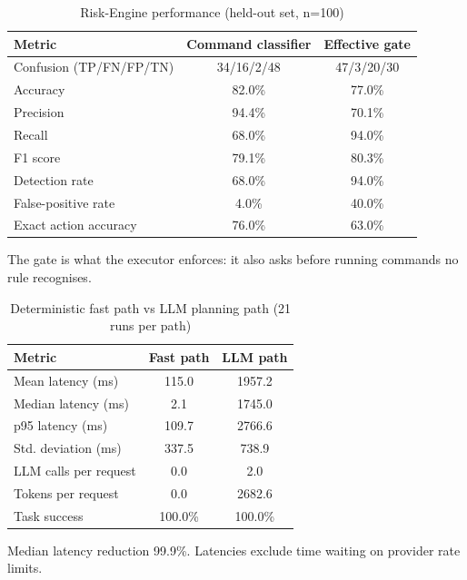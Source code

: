 \begin{table}[htbp]
\caption{Risk-Engine performance (held-out set, n=100)}
\label{tab:tableVIIb_metrics}
\centering
\begin{tabular}{lcc}
\hline
\textbf{Metric} & \textbf{Command classifier} & \textbf{Effective gate} \\
\hline
Confusion (TP/FN/FP/TN) & 34/16/2/48 & 47/3/20/30 \\
Accuracy & 82.0\% & 77.0\% \\
Precision & 94.4\% & 70.1\% \\
Recall & 68.0\% & 94.0\% \\
F1 score & 79.1\% & 80.3\% \\
Detection rate & 68.0\% & 94.0\% \\
False-positive rate & 4.0\% & 40.0\% \\
Exact action accuracy & 76.0\% & 63.0\% \\
\hline
\end{tabular}
\vspace{2pt}\footnotesize The gate is what the executor enforces: it also asks before running commands no rule recognises.
\end{table}

\begin{table}[htbp]
\caption{Deterministic fast path vs LLM planning path (21 runs per path)}
\label{tab:tableIX_fastpath}
\centering
\begin{tabular}{lcc}
\hline
\textbf{Metric} & \textbf{Fast path} & \textbf{LLM path} \\
\hline
Mean latency (ms) & 115.0 & 1957.2 \\
Median latency (ms) & 2.1 & 1745.0 \\
p95 latency (ms) & 109.7 & 2766.6 \\
Std. deviation (ms) & 337.5 & 738.9 \\
LLM calls per request & 0.0 & 2.0 \\
Tokens per request & 0.0 & 2682.6 \\
Task success & 100.0\% & 100.0\% \\
\hline
\end{tabular}
\vspace{2pt}\footnotesize Median latency reduction 99.9\%. Latencies exclude time waiting on provider rate limits.
\end{table}

